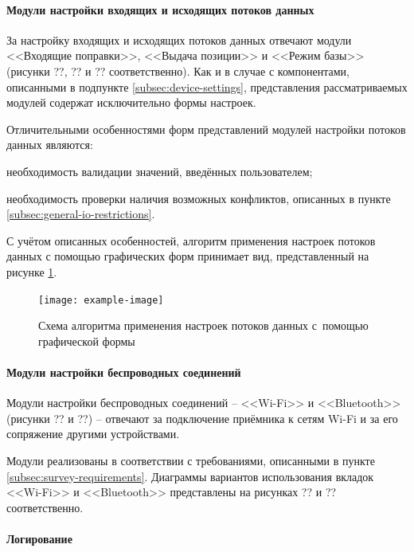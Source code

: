\paragraph{Модули настройки входящих и исходящих потоков данных}

За настройку входящих и исходящих потоков данных отвечают модули <<Входящие поправки>>, <<Выдача позиции>> и <<Режим базы>> (рисунки ??, ?? и ?? соответственно). Как и в случае с компонентами, описанными в подпункте \ref{subsec:device-settings}, представления рассматриваемых модулей содержат исключительно формы настроек.

Отличительными особенностями форм представлений модулей настройки потоков данных являются:
\begin{dashitemize}
  \item необходимость валидации значений, введённых пользователем;
  \item необходимость проверки наличия возможных конфликтов, описанных в пункте \ref{subsec:general-io-restrictions}.
\end{dashitemize}

С учётом описанных особенностей, алгоритм применения настроек потоков данных с помощью графических форм принимает вид, представленный на рисунке \ref{fig:io-form-apply}.

\begin{figure}[h!]
  \centering
  \setlength{\fboxsep}{5pt}
  \texttt{[image: example-image]}
  \vspace*{6pt}
  \caption{Схема алгоритма применения настроек потоков данных с~помощью графической формы}
  \label{fig:io-form-apply}
\end{figure}

\paragraph{Модули настройки беспроводных соединений}

Модули настройки беспроводных соединений -- <<Wi-Fi>> и <<Bluetooth>> (рисунки ?? и ??) -- отвечают за подключение приёмника к сетям Wi-Fi и за его сопряжение другими устройствами.

Модули реализованы в соответствии с требованиями, описанными в пункте \ref{subsec:survey-requirements}. Диаграммы вариантов использования вкладок <<Wi-Fi>> и <<Bluetooth>> представлены на рисунках ?? и ?? соответственно.

\paragraph{Логирование}

